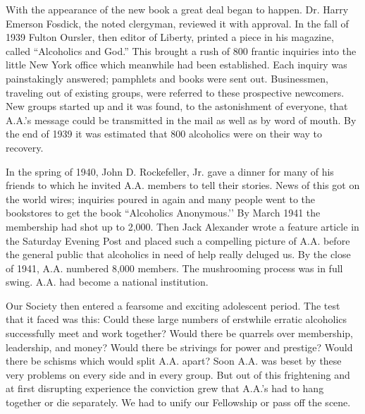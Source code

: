 \begin{biblechapter}
    With the appearance of the new book a great deal began to happen. 
\verse Dr. Harry Emerson Fosdick, 
    the noted clergyman, 
    reviewed it with approval. 
\verse In the fall of 1939 Fulton Oursler, 
    then editor of Liberty, 
    printed a piece in his magazine, 
    called “Alcoholics and God.” 
\verse This brought a rush of 800 frantic inquiries 
    into the little New York office 
    which meanwhile had been established. 
\verse Each inquiry was painstakingly answered; 
    pamphlets and books were sent out. 
\verse Businessmen, traveling out of existing groups, 
    were referred to these prospective newcomers. 
\verse New groups started up and it was found, 
    to the astonishment of everyone, 
    that A.A.’s message could be transmitted in the mail 
    as well as by word of mouth. 
\verse By the end of 1939 it was estimated that 
    800 alcoholics were on their way to recovery.

\verse In the spring of 1940, John D. Rockefeller, Jr. 
    gave a dinner for many of his friends 
    to which he invited A.A. members to tell their stories. 
\verse News of this got on the world wires; 
    inquiries poured in again 
    and many people went to the bookstores to get the book 
    “Alcoholics Anonymous.’’ 
\verse By March 1941 the membership had shot up to 2,000. 
\verse Then Jack Alexander wrote a feature article 
    in the Saturday Evening Post 
    and placed such a compelling picture of A.A. before the general public 
    that alcoholics in need of help really deluged us. 
\verse By the close of 1941, A.A. numbered 8,000 members. 
\verse The mushrooming process was in full swing.
\verse A.A. had become a national institution.

\verse Our Society then entered a fearsome and exciting adolescent period. 
\verse The test that it faced was this:
\verse Could these large numbers of erstwhile erratic alcoholics 
    successfully meet and work together? 
\verse Would there be quarrels over membership, leadership, and money? 
\verse Would there be strivings for power and prestige? 
\verse Would there be schisms which would split A.A. apart? 
\verse Soon A.A. was beset by these very problems on every side 
    and in every group. 
\verse But out of this frightening and at first disrupting experience 
    the conviction grew that A.A.’s had to hang together or die separately.
\verse We had to unify our Fellowship or pass off the scene.


\end{biblechapter}
